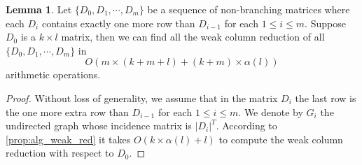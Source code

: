\documentclass{article}
\theoremstyle{definition}
\newtheorem{lemma}[theorem]{Lemma}
\begin{document}
\begin{lemma}\label{lemma:D_filtration}
Let $\{D_0, D_1, \cdots, D_m\}$ be a sequence of non-branching matrices where each $D_{i}$ contains exactly one more row than $D_{i-1}$ for each $1\leq i\leq m$.
Suppose $D_0$ is a $k\times l$ matrix,
then we can find all the weak column reduction of all $\{D_0, D_1, \cdots, D_m\}$ in
$$O\left(m\times (k+m+l) + (k+m)\times \alpha(l)\right)$$ arithmetic operations.
\end{lemma}

\begin{proof}
Without loss of generality,
we assume that in the matrix $D_{i}$ the last row is the one more extra row than $D_{i-1}$ for each $1\leq i\leq m$.
We denote by $G_i$ the undirected graph whose incidence matrix is $|D_i|^T$.
According to \cref{prop:alg_weak_red} it takes $O(k\times \alpha(l)+l)$ to compute the weak column reduction with respect to $D_0$.


\end{proof}
\end{document}
